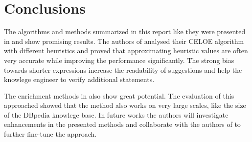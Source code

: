 \section{Conclusions}
The algorithms and methods summarized in this report like they were presented
in \cite{paper1} and \cite{paper2} show promising results. The authors of
\cite{paper1} analysed their CELOE algorithm with different heuristics and
proved that approximating heuristic values are often very accurate while
improving the performance significantly. The strong bias towards shorter
expressions increase the readability of suggestions and help the knowlege
engineer to verify additional statements. 

The enrichment methods in \cite{paper2} also show great potential. The
evaluation of this approached showed that the method also works on very large
scales, like the size of the DBpedia knowlege base. In future works the authors
will investigate enhancements in the presented methods and collaborate with the
authors of \cite{31} to further fine-tune the approach.
